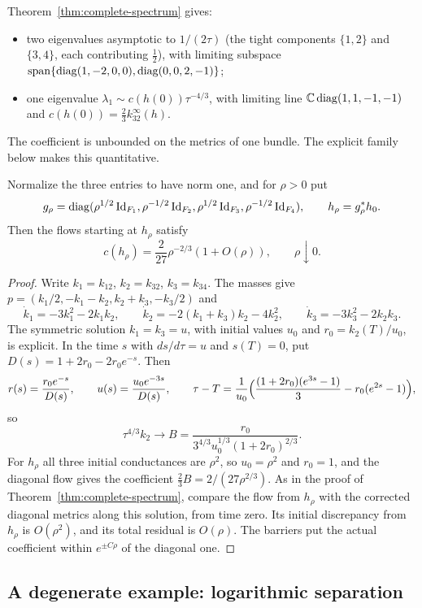 Theorem~\ref{thm:complete-spectrum} gives:
\begin{itemize}
\item two eigenvalues asymptotic to $1/(2\tau)$ (the tight components
 $\{1,2\}$ and $\{3,4\}$, each contributing $\frac12$), with limiting
 subspace $\operatorname{span}\{\operatorname{diag}(1,-2,0,0),\operatorname{diag}(0,0,2,-1)\}$;
\item one eigenvalue $\lambda_1\sim c(h(0))\tau^{-4/3}$, with limiting line
 $\mathbb C\operatorname{diag}(1,1,-1,-1)$ and $c(h(0))=\frac23k^\infty_{32}(h)$.
\end{itemize}
The coefficient is unbounded on the metrics of one bundle. The explicit
family below makes this quantitative.

\begin{proposition}\label{prop:unequal-rank-family}
Normalize the three entries to have norm one, and for $\rho>0$ put
\[
 g_\rho=\operatorname{diag}(\rho^{1/2}\operatorname{Id}_{F_1},\rho^{-1/2}\operatorname{Id}_{F_2},
              \rho^{1/2}\operatorname{Id}_{F_3},\rho^{-1/2}\operatorname{Id}_{F_4}),\qquad
 h_\rho=g_\rho^*h_0.
\]
Then the flows starting at $h_\rho$ satisfy
\[
 c(h_\rho)=\frac2{27}\rho^{-2/3}(1+O(\rho)),\qquad\rho\downarrow0.
\]
\end{proposition}

\begin{proof}
Write $k_1=k_{12}$, $k_2=k_{32}$, $k_3=k_{34}$. The masses give
$p=(k_1/2,-k_1-k_2,k_2+k_3,-k_3/2)$ and
\[
 \dot k_1=-3k_1^2-2k_1k_2,\qquad\dot k_2=-2(k_1+k_3)k_2-4k_2^2,\qquad
 \dot k_3=-3k_3^2-2k_2k_3.
\]
The symmetric solution $k_1=k_3=u$, with initial values $u_0$ and
$r_0=k_2(T)/u_0$, is explicit. In the time $s$ with $ds/d\tau=u$ and $s(T)=0$, put
$D(s)=1+2r_0-2r_0e^{-s}$. Then
\[
 r(s)=\frac{r_0e^{-s}}{D(s)},\qquad
 u(s)=\frac{u_0e^{-3s}}{D(s)},\qquad
 \tau-T=\frac1{u_0}\Bigl(\frac{(1+2r_0)(e^{3s}-1)}3-r_0(e^{2s}-1)\Bigr),
\]
so
\[
 \tau^{4/3}k_2\longrightarrow B=\frac{r_0}{3^{4/3}u_0^{1/3}(1+2r_0)^{2/3}}.
\]
For $h_\rho$ all three initial conductances are $\rho^2$, so $u_0=\rho^2$ and
$r_0=1$, and the diagonal flow gives the coefficient
$\frac23B=2/(27\rho^{2/3})$. As in the proof of
Theorem~\ref{thm:complete-spectrum}, compare the flow from $h_\rho$ with the
corrected diagonal metrics along this solution, from time zero. Its initial
discrepancy from $h_\rho$ is $O(\rho^2)$, and its total residual is
$O(\rho)$. The barriers put the actual coefficient within
$e^{\pm C\rho}$ of the diagonal one.
\end{proof}

\subsection{A degenerate example: logarithmic separation}

